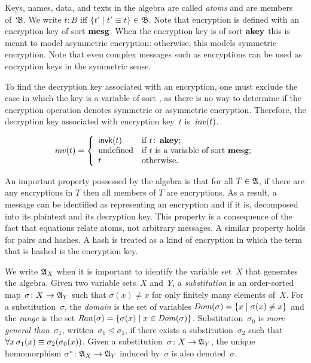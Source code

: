 \documentclass[12pt]{report}
\theoremstyle{definition}
\newcommand{\alga}{\alg{A}}
\newcommand{\base}{\ensuremath{\mathfrak B}}
\newcommand{\sdom}{\fn{Dom}}
\newcommand{\sran}{\fn{Ran}}
\begin{document}
Keys, names, data, and texts in the algebra are called
\emph{atoms} and are members of~$\base$.  We write
$t\colon B$ iff $\{t'\mid t'\equiv t\}\in\base$.  Note that encryption
is defined with an encryption key of sort $\operatorname{\mathbf{mesg}}$.  When the
encryption key is of sort $\operatorname{\mathbf{akey}}$ this is meant to model
asymmetric encryption: otherwise, this models symmetric encryption.
Note that even complex messages such as encryptions can be used as
encryption keys in the symmetric sense.

To find the decryption key associated with an encryption, one must
exclude the case in which the key is a variable of sort ,
as there is no way to determine if the encryption operation denotes
symmetric or asymmetric encryption.  Therefore, the decryption
key associated with encryption key~$t$
is~$\operatorname{\mathit{inv}}(t)$.

$$\operatorname{\mathit{inv}}(t) =\left\{
\begin{array}{ll}
\operatorname{\mathsf{invk}}(t)&\mbox{if $t\colon\operatorname{\mathbf{akey}}$;}\\
\mbox{undefined}&\mbox{if $t$ is a variable of sort $\operatorname{\mathbf{mesg}}$;}\\
t&\mbox{otherwise.}
\end{array}\right.$$

An important property possessed by the algebra is that for all
$T\in\alga$, if there are any encryptions in $T$ then all members of
$T$ are encryptions.  As a result, a message can be identified as
representing an encryption and if it is, decomposed into its plaintext
and its decryption key.  This property is a consequence of the fact
that equations relate atoms, not arbitrary messages.  A similar
property holds for pairs and hashes.  A hash is treated as
a kind of encryption in which the term that is hashed is the
encryption key.

We write $\alga_X$ when it is important to identify the variable
set~$X$ that generates the algebra.  Given two variable sets~$X$
and~$Y$, a \emph{substitution} is an order-sorted
map~$\sigma\colon X\rightarrow\alga_Y$ such that $\sigma(x)\neq x$ for
only finitely many elements of~$X$.  For a substitution~$\sigma$, the
\emph{domain} is the set of variables
$\sdom(\sigma)=\{x\mid \sigma(x)\neq x\}$ and the
\emph{range} is the set $\sran(\sigma)=\{\sigma(x)\mid
x\in\sdom(\sigma)\}$.  Substitution~$\sigma_0$ is \emph{more general than}~$\sigma_1$,
written~$\sigma_0\unlhd\sigma_1$, if there exists a
substitution~$\sigma_2$ such that
$\mathop{\forall x}\sigma_1(x)\equiv\sigma_2(\sigma_0(x))$.  Given a
substitution~$\sigma\colon X\rightarrow\alga_Y$, the unique
homomorphism $\sigma^\ast\colon
\alga_X\rightarrow\alga_Y$ induced by~$\sigma$ is also
denoted~$\sigma$.
\end{document}
